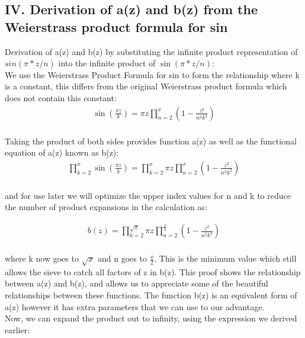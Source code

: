 \documentclass{article}
\begin{document}
\newpage
\subsection*{IV. Derivation of a(z) and b(z) from the Weierstrass product formula for sin}
Derivation of a(z) and b(z) by substituting the infinite product representation of $sin(\pi*z/n)$ into the infinite product of $\sin(\pi*z/n)$: \\

We use the Weierstrass Product Formula for sin to form the relationship where k is a constant, this differs from the original Weierstrass product formula which does not contain this constant: \\
\begin{align*}
	\sin\left(\frac{\pi z}{k}\right) = \pi z\prod_{n=2}^x \left(1-\frac{z^2}{n^2k^2}\right) \\
\end{align*}

Taking the product of both sides provides function a(z) as well as the functional equation of a(z) known as b(z): \\
\begin{align*}
	\prod_{k=2}^x\sin\left(\frac{\pi z}{k}\right) = \prod_{k=2}^x \pi z\prod_{n=2}^x \left(1-\frac{z^2}{n^2k^2}\right) \\
\end{align*}

and for use later we will optimize the upper index values for n and k to reduce the number of product expansions in the calculation as:

\begin{align*}
	b(z) = \prod_{k=2}^{\sqrt{x}} \pi z\prod_{n=2}^{\frac{x}{2}} \left(1-\frac{z^2}{n^2k^2}\right) \\
\end{align*}

where k now goes to $\sqrt{x}$ and n goes to $\frac{x}{2}$. This is the minimum value which still allows the sieve to catch all factors of z in b(z). This proof shows the relationship between a(z) and b(z), and allows us to appreciate some of the beautiful relationships between these functions. The function b(z) is an equivalent form of a(z) however it has extra parameters that we can use to our advantage. \\

Now, we can expand the product out to infinity, using the expression we derived earlier:
\end{document}

